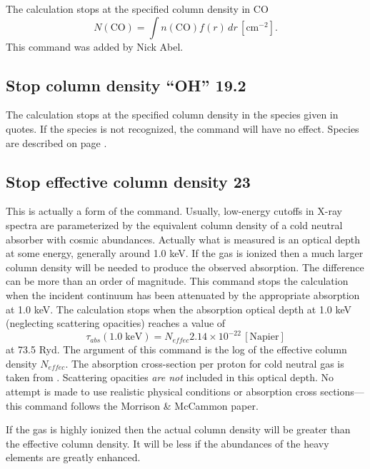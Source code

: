 The calculation stops at the specified column density in CO
\begin{equation}
N\left( {{\mathrm{CO}}} \right) = \int {n\left( {{\mathrm{CO}}} \right)f\left( r
\right)\,dr}
\,[\mathrm{cm}^{-2}] .%
\end{equation}
This command was added by Nick Abel.

\subsection{Stop column density ``OH'' 19.2}
The calculation stops at the specified column density in the species given in quotes.  If the species is not recognized, the command will have no effect.  
Species are described on page \pageref{sec:SpeciesDefine}.

\subsection{Stop effective column density 23  }

This is actually a form of the  command.
Usually, low-energy cutoffs in X-ray spectra are
parameterized by the equivalent column density of a cold neutral absorber
with cosmic abundances.
Actually what is measured is an optical depth at
some energy, generally around 1.0 keV.
If the gas is ionized then a much
larger column density will be needed to produce the observed absorption.
The difference can be more than an order of magnitude.
This command stops
the calculation when the incident continuum has been attenuated by the
appropriate absorption at 1.0 keV.
The calculation stops when the absorption
optical depth at 1.0 keV (neglecting scattering opacities)
reaches a value of
\begin{equation}
\tau _{abs} \left( {1.0\;{\mathrm{keV}}} \right) = N_{effec} 2.14 \times 10^{
- 22}
\, [\mathrm{Napier}]
\end{equation}
at 73.5 Ryd.
The argument of this command is the log of the effective column
density $N_{effec}$.
The absorption cross-section per proton for cold neutral
gas is taken from \citet{Morrison1983}.
Scattering opacities \emph{are not} included in this optical depth.
No attempt is made to use realistic
physical conditions or absorption cross sections---this command follows
the Morrison \& McCammon paper.

If the gas is highly ionized then the actual column density will be
greater than the effective column density.
It will be less if the abundances
of the heavy elements are greatly enhanced.

